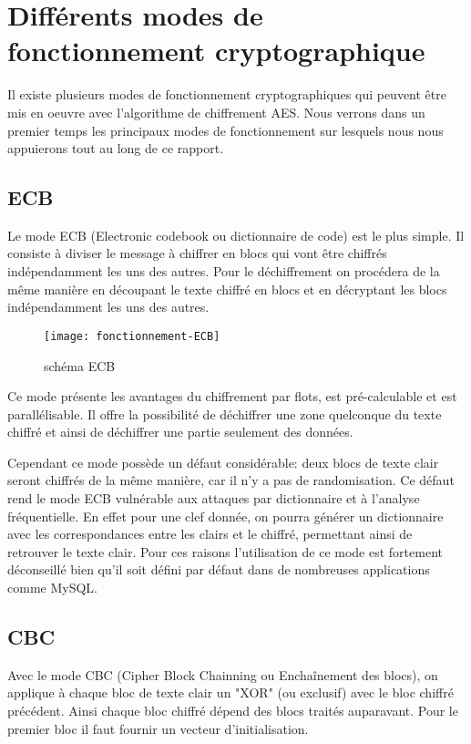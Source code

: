 \chapter{Différents modes de fonctionnement cryptographique}
\label{chap:différents modes}

Il existe plusieurs modes de fonctionnement cryptographiques qui peuvent être mis en oeuvre avec l'algorithme de chiffrement AES. Nous verrons dans un premier temps les principaux modes de fonctionnement sur lesquels nous nous appuierons tout au long de ce rapport.

\section{ECB}

Le mode ECB (Electronic codebook ou dictionnaire de code) est le plus simple. Il consiste à diviser le message à chiffrer en blocs qui vont être chiffrés indépendamment les uns des autres. Pour le déchiffrement on procédera de la même manière en découpant le texte chiffré en blocs et en décryptant les blocs indépendamment les uns des autres.

\begin{figure}[!h]
  \centering
  \texttt{[image: fonctionnement-ECB]}
  \caption{schéma ECB \cite{wiki}}
  \label{schema ECB}
\end{figure}

Ce mode présente les avantages du chiffrement par flots, est pré-calculable et est parallélisable. Il offre la possibilité de déchiffrer une zone quelconque du texte chiffré et ainsi de déchiffrer une partie seulement des données.

Cependant ce mode possède un défaut considérable: deux blocs de texte clair seront chiffrés de la même manière, car il n'y a pas de randomisation. Ce défaut rend le mode ECB vulnérable aux attaques par dictionnaire et à l'analyse fréquentielle. En effet pour une clef donnée, on pourra générer un dictionnaire avec les correspondances entre les clairs et le chiffré, permettant ainsi de retrouver le texte clair. Pour ces raisons l'utilisation de ce mode est fortement déconseillé bien qu'il soit défini par défaut dans de nombreuses applications comme MySQL.

\section{CBC}
\label{cbc}
Avec le mode CBC (Cipher Block Chainning ou Enchaînement des blocs), on applique à chaque bloc de texte clair un "XOR" (ou exclusif) avec le bloc chiffré précédent. Ainsi chaque bloc chiffré dépend des blocs traités auparavant. Pour le premier bloc il faut fournir un vecteur d'initialisation.

